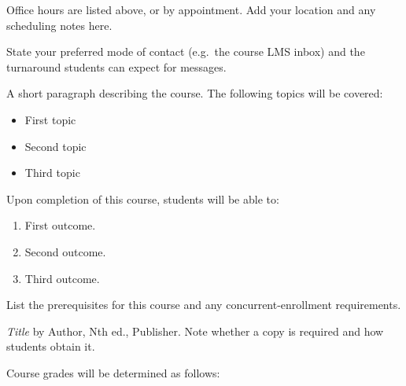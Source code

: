 \documentclass[
	course-subject  = Subject,            %
	course-number   = 000,                %
	course-title    = Course Title,       %
	short-title     = Short Title,        %
	course-section  = 0000,
	term            = Term Year,
	instructor      = Instructor Name,
	email           = you@university.edu,
	office          = Building 000,
	office-hours    = Days 0:00--0:00,
	class-time      = Days 0:00--0:00,
	course-room     = Building 000,
]{syllabus}
\begin{document}
\maketitle

Office hours are listed above, or by appointment. Add your location and any
scheduling notes here.

State your preferred mode of contact (e.g.\ the course LMS inbox) and the
turnaround students can expect for messages.

A short paragraph describing the course. The following topics will be covered:
\begin{itemize}
	\item First topic
	\item Second topic
	\item Third topic
\end{itemize}

Upon completion of this course, students will be able to:
\begin{enumerate}
	\item First outcome.
	\item Second outcome.
	\item Third outcome.
\end{enumerate}

List the prerequisites for this course and any concurrent-enrollment
requirements.

\textit{Title} by Author, Nth ed., Publisher. Note whether a copy is required
and how students obtain it.

Course grades will be determined as follows:

\end{document}
